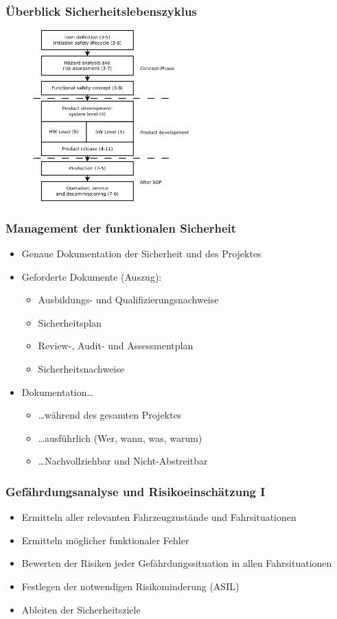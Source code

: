\documentclass[]{beamer}
\begin{document}
\begin{frame}
\frametitle{Überblick Sicherheitslebenszyklus}
\begin{figure}
   \includegraphics[width=6cm]{Abb_6_1}
\end{figure}
\end{frame}


\begin{frame}
\frametitle{Management der funktionalen Sicherheit}

\begin{itemize}
    \item Genaue Dokumentation der Sicherheit und des Projektes
    \item Geforderte Dokumente (Auszug):
    \begin{itemize}
        \item Ausbildungs- und Qualifizierungsnachweise
        \item Sicherheitsplan
        \item Review-, Audit- und Assessmentplan
        \item Sicherheitsnachweise
    \end{itemize}
    \item Dokumentation\dots
    \begin{itemize}
        \item \dots während des gesamten Projektes
        \item \dots ausführlich (Wer, wann, was, warum)
        \item \dots Nachvollziehbar und Nicht-Abstreitbar
    \end{itemize}
\end{itemize}

\end{frame}

\begin{frame}
\frametitle{Gefährdungsanalyse und Risikoeinschätzung I}

\begin{itemize}
    \item Ermitteln aller relevanten Fahrzeugzustände und Fahrsituationen
    \item Ermitteln möglicher funktionaler Fehler
    \item Bewerten der Risiken jeder Gefährdungssituation in allen Fahrsituationen
    \item Festlegen der notwendigen Risikominderung (ASIL)
    \item Ableiten der Sicherheitsziele
\end{itemize}

\end{frame}
\end{document}
